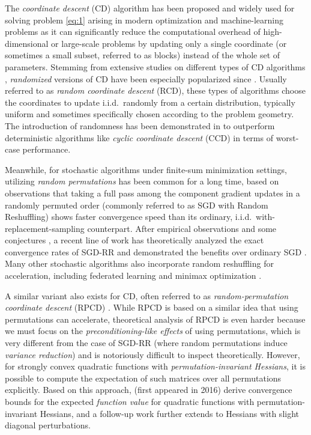 \documentclass{article}
\theoremstyle{plain}
\theoremstyle{definition}
\theoremstyle{remark}
\begin{document}
The \emph{coordinate descent} (CD) algorithm has been proposed and widely used for solving problem \eqref{eq:1} arising in modern optimization and machine-learning problems as it can significantly reduce the computational overhead of high-dimensional or large-scale problems by updating only a single coordinate (or sometimes a small subset, referred to as blocks) instead of the whole set of parameters.
Stemming from extensive studies on different types of CD algorithms \citep{beck13,lee13,wright15,nesterov17}, \textit{randomized} versions of CD have been especially popularized since \citet{nesterov12,richtarik11}.
Usually referred to as \emph{random coordinate descent} (RCD), these types of algorithms choose the coordinates to update i.i.d.\ randomly from a certain distribution, typically uniform and sometimes specifically chosen according to the problem geometry.
The introduction of randomness has been demonstrated in \citet{sun16} to outperform deterministic algorithms like \emph{cyclic coordinate descent} (CCD) in terms of worst-case performance.

Meanwhile, for stochastic algorithms under finite-sum minimization settings, utilizing \emph{random permutations} has been common for a long time, based on observations that taking a full pass among the component gradient updates in a randomly permuted order (commonly referred to as SGD with Random Reshuffling) shows faster convergence speed than its ordinary, i.i.d.\ with-replacement-sampling counterpart.
After empirical observations and some conjectures \citep{bottou09,recht12}, a recent line of work has theoretically analyzed the exact convergence rates of SGD-RR and demonstrated the benefits over ordinary SGD 
\citep{ahn20,mishchenko20,cha2023,liu2024}.
Many other stochastic algorithms also incorporate random reshuffling for acceleration, including federated learning \citep{mishchenko22a,yun2022} and minimax optimization \citep{das22,cho2023}.

A similar variant also exists for CD, often referred to as \emph{random-permutation coordinate descent} (RPCD) \citep{sun20}.
While RPCD is based on a similar idea that using permutations can accelerate,
theoretical analysis of RPCD is even harder because we must focus on the \emph{preconditioning-like effects} of using permutations, which is very different from the case of SGD-RR (where random permutations induce \emph{variance reduction}) and is notoriously difficult to inspect theoretically.
However, for strongly convex quadratic functions with \emph{permutation-invariant Hessians}, it is possible to compute the expectation of such matrices over all permutations explicitly.
Based on this approach, \citet{lee2019} (first appeared in 2016) derive convergence bounds for the expected \emph{function value} for quadratic functions with permutation-invariant Hessians, and a follow-up work \citet{wright17} further extends to Hessians with slight diagonal perturbations.
\end{document}
